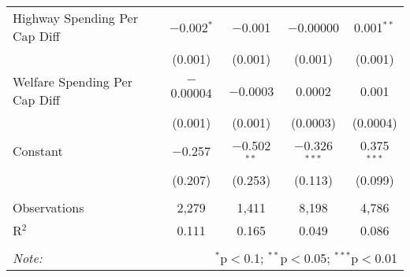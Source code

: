 \begin{table}[!htbp]
\begin{tabular}{@{\extracolsep{5pt}}lcccc}
  Highway Spending Per Cap Diff & $-$0.002$^{*}$ & $-$0.001 & $-$0.00000 & 0.001$^{**}$ \\ 
  & (0.001) & (0.001) & (0.001) & (0.001) \\ 
  Welfare Spending Per Cap Diff & $-$0.00004 & $-$0.0003 & 0.0002 & 0.001 \\ 
  & (0.001) & (0.001) & (0.0003) & (0.0004) \\ 
  Constant & $-$0.257 & $-$0.502$^{**}$ & $-$0.326$^{***}$ & 0.375$^{***}$ \\ 
  & (0.207) & (0.253) & (0.113) & (0.099) \\ 
 \hline \\[-1.8ex] 
Observations & 2,279 & 1,411 & 8,198 & 4,786 \\ 
R$^{2}$ & 0.111 & 0.165 & 0.049 & 0.086 \\ 
\hline 
\hline \\[-1.8ex] 
\textit{Note:}  & \multicolumn{4}{r}{$^{*}$p$<$0.1; $^{**}$p$<$0.05; $^{***}$p$<$0.01} \\ 
\end{tabular} 
\end{table} 
